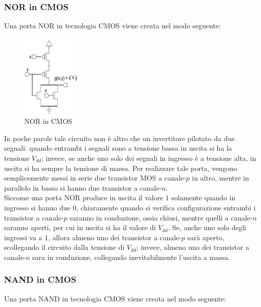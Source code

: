 \documentclass[a4paper]{extarticle}
\begin{document}
\vspace{1em}
\noindent
\subsubsection{NOR in CMOS}
Una porta NOR in tecnologia CMOS viene creata nel modo seguente:

\begin{figure}[H]
    \centering
    \includegraphics[width=0.25\textwidth]{nor-cmos.png}
    \caption{NOR in CMOS}
    \label{fig:nor_cmos}
\end{figure}

\vspace{1em}
\noindent
In poche parole tale circuito non è altro che un invertitore pilotato da due segnali: quando entrambi i segnali sono a tensione bassa in uscita si ha la tensione $V_{dd}$; invece, se anche uno solo dei segnali in ingresso è a tensione alta, in uscita si ha sempre la tensione di massa. Per realizzare tale porta, vengono semplicemente messi in serie due transistor MOS a canale-$p$ in altro, mentre in parallelo in basso si hanno due transistor a canale-$n$.\\
Siccome una porta NOR produce in uscita il valore $1$ solamente quando in ingresso si hanno due $0$, chiaramente quando si verifica configurazione entrambi i transistor a canale-$p$ saranno in conduzione, ossia chiusi, mentre quelli a canale-$n$ saranno aperti, per cui in uscita si ha il valore di $V_{dd}$. Se, anche uno solo degli ingressi va a $1$, allora almeno uno dei transistor a canale-$p$ sarà aperto, scollegando il circuito dalla tensione di $V_{dd}$; invece, almeno uno dei transistor a canale-$n$ sara in conduzione, collegando inevitabilmente l'uscita a massa.

\vspace{1em}
\noindent
\subsubsection{NAND in CMOS}
Una porta NAND in tecnologia CMOS viene creata nel modo seguente:
\end{document}
